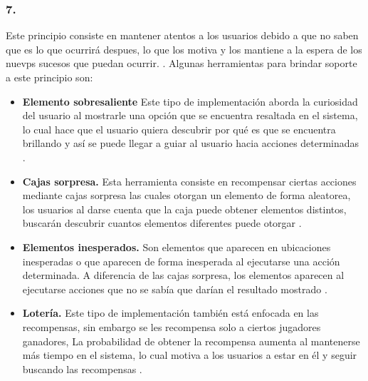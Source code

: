 \subsubsection{7. \principioVII}
\label{subsec:principioVII}

 Este principio consiste en mantener atentos a los usuarios debido a que no saben que es lo que
 ocurrirá despues, lo que los motiva y los mantiene a la espera de los nuevps sucesos que puedan
 ocurrir. \cite[pp. 27, 273]{Octalysis}. Algunas herramientas para brindar soporte a este
 principio son:
       
    \begin{itemize}
    \item
    {\bf Elemento sobresaliente} %
        Este tipo de implementación aborda la curiosidad del usuario al mostrarle una opción
        que se encuentra resaltada en el sistema, lo cual hace que el usuario quiera descubrir
        por qué es que se encuentra brillando y así se puede llegar a guiar al usuario hacia
        acciones determinadas \cite[p. 297]{Octalysis}.
           
    \item
    {\bf Cajas sorpresa.}
        Esta herramienta consiste en recompensar ciertas acciones mediante cajas sorpresa
        las cuales otorgan un elemento de forma aleatorea, los usuarios al darse cuenta que
        la caja puede obtener elementos distintos, buscarán descubrir cuantos elementos diferentes
        puede otorgar \cite[p. 299]{IOctalysis}.
           
    \item
    {\bf Elementos inesperados.} %
        Son elementos que aparecen en ubicaciones inesperadas o que aparecen de forma inesperada
        al ejecutarse una acción determinada. A diferencia de las cajas sorpresa, los elementos
        aparecen al ejecutarse acciones que no se sabía que darían el resultado mostrado
        \cite[p. 301]{Octalysis}.
           
    \item
    {\bf Lotería.}
        Este tipo de implementación también está enfocada en las recompensas, sin embargo se les
        recompensa solo a ciertos jugadores ganadores, La probabilidad de obtener la recompensa
        aumenta al mantenerse más tiempo en el sistema, lo cual motiva a los usuarios
        a estar en él y seguir buscando las recompensas \cite[p. 305]{Octalysis}.
    \end{itemize}

